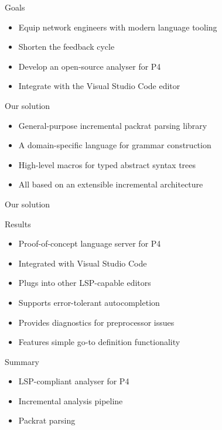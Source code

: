 \documentclass[aspectratio=169]{beamer}
\begin{document}
\begin{frame}{Goals}
	\begin{itemize}
		\item Equip network engineers with modern language tooling \pause
		\item Shorten the feedback cycle \pause
		\item Develop an open-source analyser for P4 \pause
		\item Integrate with the Visual Studio Code editor
	\end{itemize}
\end{frame}

\begin{frame}{Our solution}
	\begin{itemize}
		\item General-purpose \alert{incremental} packrat \alert{parsing}
		library \pause
		\item A domain-specific language for grammar construction \pause
		\item High-level macros for \alert{typed abstract syntax trees} \pause
		\item All based on an extensible incremental architecture
	\end{itemize}
\end{frame}

\begin{frame}{Our solution}
	\begin{overprint}

	\end{overprint}
\end{frame}

\begin{frame}{Results}
	\begin{itemize}
		\item Proof-of-concept language server for P4 \pause
		\item Integrated with Visual Studio Code \pause
		\item Plugs into other LSP-capable editors \pause
		\item Supports \alert{error-tolerant autocompletion} \pause
		\item Provides diagnostics for preprocessor issues \pause
		\item Features simple go-to definition functionality
	\end{itemize}
\end{frame}

\begin{frame}{Summary}
	\begin{itemize}
		\item LSP-compliant analyser for P4 \pause
		\item Incremental analysis pipeline \pause
		\item Packrat parsing
	\end{itemize}
\end{frame}
\end{document}
